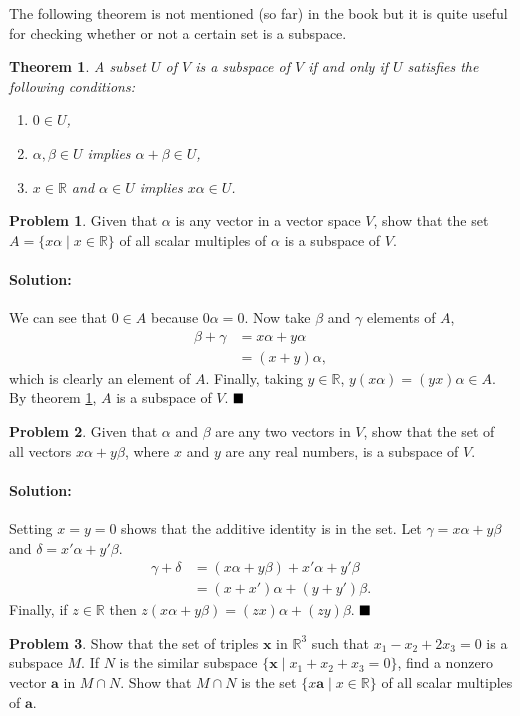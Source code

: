 \documentclass[]{article}
\newcommand{\RR}{\mathbb{R}}
\newtheorem{theorem}{Theorem}[section]
\theoremstyle{definition}
\newtheorem{problem}{Problem}
\newenvironment{solution}{\paragraph{Solution:}}{\hfill$\blacksquare \\$}
\begin{document}
The following theorem is not mentioned (so far) in the book but it is quite useful for checking whether or not a certain set is a subspace.
\begin{theorem}\label{subspace:1}
	A subset $U$ of $V$ is a subspace of $V$ if and only if $U$ satisfies the following conditions:
	\begin{enumerate}
		\item $0 \in U$,
		\item $\alpha, \beta \in U$ implies $\alpha + \beta \in U$,
		\item $x \in \RR$ and $\alpha \in U$ implies $x\alpha \in U$.
	\end{enumerate}
\end{theorem}
\begin{problem}
	Given that $\alpha$ is any vector in a vector space $V$, show that the set $A = \{x\alpha \mid x \in \RR \}$ of all scalar multiples of $\alpha$ is a subspace of $V$.
\end{problem}
\begin{solution}
	We can see that $0 \in A$  because $0 \alpha = 0$. Now take $\beta$ and $\gamma$ elements of $A$, 
	\begin{align*}
		\beta + \gamma &= x \alpha + y \alpha \\ 
		&= (x + y)\alpha,
	\end{align*}
	which is clearly an element of $A$. Finally, taking $y \in \RR$, $y(x\alpha) = (yx) \alpha \in A$.
	By theorem \ref{subspace:1}, $A$ is a subspace of $V$.
\end{solution}
\begin{problem}
	Given that $\alpha$ and $\beta$ are any two vectors in $V$, show that the set of all vectors $x\alpha + y\beta$, where $x$ and $y$ are any real numbers, is a subspace of $V$.
\end{problem}
\begin{solution}
	Setting $x = y = 0$ shows that the additive identity is in the set. Let $\gamma = x\alpha + y\beta$ and $\delta = x'\alpha + y'\beta$.
	\begin{align*}
		\gamma + \delta &= (x\alpha + y\beta) + x'\alpha + y'\beta \\
						&= (x+x')\alpha + (y + y')\beta.
	\end{align*}
	Finally, if $z \in \RR$ then $z(x\alpha + y\beta) = (zx)\alpha + (zy)\beta$.
\end{solution}
\begin{problem}
	Show that the set of triples $\mathbf{x}$ in $\RR^3$ such that $x_1 - x_2 + 2x_3 = 0$ is a subspace $M$. If $N$ is the similar subspace $\{ \mathbf{x} \mid x_1 + x_2 + x_3 = 0 \}$, find a nonzero vector $\textbf{a}$ in $M \cap N$. Show that $M \cap N$ is the set $\{x\mathbf{a} \mid x \in \RR \}$ of all scalar multiples of $\mathbf{a}$.
\end{problem}
\end{document}
